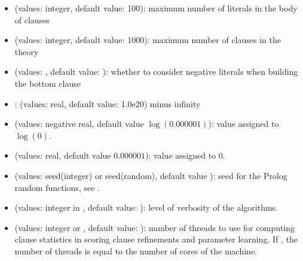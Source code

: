 \documentclass[letterpaper,10pt,english]{sphinxmanual}
\begin{document}
\begin{itemize}
\item {} 
\sphinxAtStartPar
{} (values: integer, default value: 100): maximum number of literals in the body of clauses

\item {} 
\sphinxAtStartPar
{} (values: integer, default value: 1000): maximum number of clauses in the theory

\item {} 
\sphinxAtStartPar
{} (values: , default value: ): whether to consider negative literals when building the bottom clause

\item {} 
\sphinxAtStartPar
{}: (values: real, default value: \sphinxhyphen{}1.0e20) minus infinity

\item {} 
\sphinxAtStartPar
{} (values: negative real, default value \(\log(0.000001)\)): value assigned to \(\log(0)\).

\item {} 
\sphinxAtStartPar
{} (values: real, default value \(0.000001\)): value assigned to \(0\).

\item {} 
\sphinxAtStartPar
{} (values: seed(integer) or seed(random), default value ): seed for the Prolog random functions, see  .

\item {} 
\sphinxAtStartPar
{} (values: integer in \sphinxcode{\sphinxupquote{{[}1,4{]}}}, default value: ): level of verbosity of the algorithms.

\item {} 
\sphinxAtStartPar
{} (values: integer or , default value: ): number of threads to use for computing clause statistics in scoring clause refinements and parameter learning. If , the number of threads is equal to the number of cores of the machine.

\end{itemize}
\end{document}
